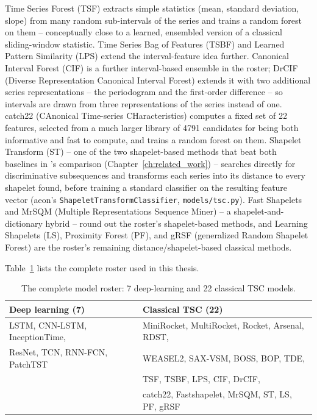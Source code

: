 Time Series Forest (TSF) \citep{deng2013tsf} extracts simple statistics (mean, standard deviation, slope) from many random sub-intervals of the series and trains a random forest on them -- conceptually close to a learned, ensembled version of a classical sliding-window statistic. Time Series Bag of Features (TSBF) \citep{baydogan2013tsbf} and Learned Pattern Similarity (LPS) \citep{baydogan2016lps} extend the interval-feature idea further. Canonical Interval Forest (CIF) is a further interval-based ensemble in the roster; DrCIF (Diverse Representation Canonical Interval Forest) extends it with two additional series representations -- the periodogram and the first-order difference -- so intervals are drawn from three representations of the series instead of one. catch22 (CAnonical Time-series CHaracteristics) \citep{lubba2019catch22} computes a fixed set of 22 features, selected from a much larger library of 4791 candidates for being both informative and fast to compute, and trains a random forest on them. Shapelet Transform (ST) -- one of the two shapelet-based methods that beat both baselines in \citet{bagnall2017bakeoff}'s comparison (Chapter~\ref{ch:related_work}) -- searches directly for discriminative subsequences and transforms each series into its distance to every shapelet found, before training a standard classifier on the resulting feature vector (aeon's \texttt{ShapeletTransformClassifier}, \texttt{models/tsc.py}). Fast Shapelets \citep{rakthanmanon2013fastshapelets} and MrSQM (Multiple Representations Sequence Miner) -- a shapelet-and-dictionary hybrid -- round out the roster's shapelet-based methods, and Learning Shapelets (LS), Proximity Forest (PF), and gRSF (generalized Random Shapelet Forest) are the roster's remaining distance/shapelet-based classical methods.

Table~\ref{tab:model_roster} lists the complete roster used in this thesis.

\begin{table}[htbp]
\centering
\caption{The complete model roster: 7 deep-learning and 22 classical TSC models.}
\label{tab:model_roster}
\begin{tabular}{ll}
\toprule
\textbf{Deep learning (7)} & \textbf{Classical TSC (22)} \\
\midrule
LSTM, CNN-LSTM, InceptionTime, & MiniRocket, MultiRocket, Rocket, Arsenal, RDST, \\
ResNet, TCN, RNN-FCN, PatchTST & WEASEL2, SAX-VSM, BOSS, BOP, TDE, \\
 & TSF, TSBF, LPS, CIF, DrCIF, \\
 & catch22, Fastshapelet, MrSQM, ST, LS, PF, gRSF \\
\bottomrule
\end{tabular}
\end{table}

